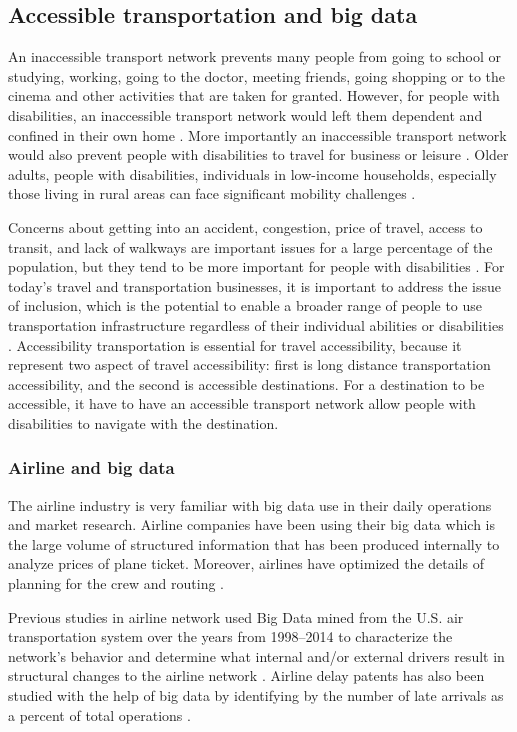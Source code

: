 \subsection{Accessible transportation and big data}
An inaccessible transport network prevents many people from going to school 
or studying, working, going to the doctor, meeting friends, going shopping 
or to the cinema and other activities that are taken for granted. However,
for people with disabilities, an inaccessible transport
network would left them dependent and confined in their own home \cite{Ama}. 
More importantly an inaccessible transport network would also prevent people with disabilities to
travel for business or leisure \cite{milo}.
Older adults, people with disabilities, individuals in low-income households, especially 
those living in rural areas can face significant mobility challenges \cite{moya2016dynamic}. 

Concerns about getting into an accident, congestion,
price of travel, access to transit, and lack of walkways are important issues for a large
percentage of the population, but they tend to be more important for people with
disabilities \cite{moya2016dynamic}. For today's travel and transportation businesses,
it is important to address the issue of inclusion, which is the potential to enable 
a broader range of  people to use
transportation infrastructure regardless of their individual abilities or disabilities
\cite{milo}. Accessibility transportation is essential for travel accessibility, 
because it represent two aspect of travel accessibility: 
first is long distance transportation accessibility, and the second is accessible destinations. 
For a destination to be accessible, 
it have to have an accessible transport network allow people with disabilities 
to navigate with the destination.


\subsubsection{Airline and big data}
The airline industry is very familiar with big data use in their daily operations
and market research. Airline companies have been using their big data which is 
the large volume of structured information that has been produced internally 
\cite{MIAH2017} to analyze prices of plane ticket. Moreover, airlines 
have optimized the details of planning for the crew and routing \cite{Shafiee16}. 

Previous studies in airline network used Big Data mined from the U.S. air 
transportation system over the years from 1998–2014 to characterize the 
network's behavior and determine what internal and/or external drivers result 
in structural changes to the airline network \cite{7777957}. Airline delay 
patents has also been studied with the help of big data by identifying by the 
number of late arrivals as a percent of total operations \cite{Sor}. 

